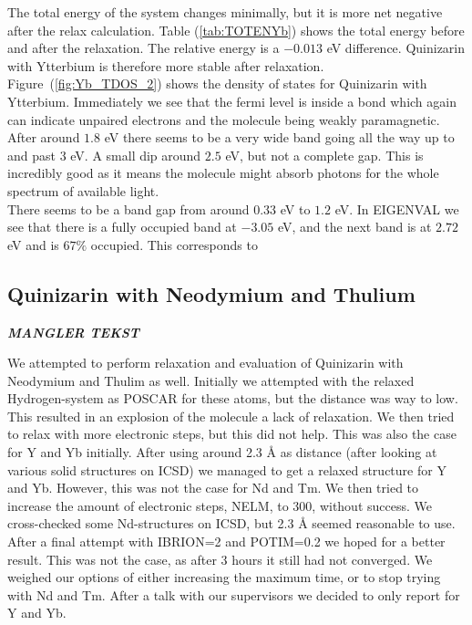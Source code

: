 \documentclass{article}
\begin{document}
    The total energy of the system changes minimally, but it is more net negative after the relax calculation. Table (\ref{tab:TOTENYb}) shows the total energy before and after the relaxation. The relative energy is a $-0.013$ eV difference. Quinizarin with Ytterbium is therefore more stable after relaxation. \\

    Figure~(\ref{fig:Yb_TDOS_2}) shows the density of states for Quinizarin with Ytterbium. Immediately we see that the fermi level is inside a bond which again can indicate unpaired electrons and the molecule being weakly paramagnetic. After around $1.8$ eV there seems to be a very wide band going all the way up to and past $3$ eV. A small dip around $2.5$ eV, but not a complete gap. This is incredibly good as it means the molecule might absorb photons for the whole spectrum of available light. \\

    There seems to be a band gap from around $0.33$ eV to $1.2$ eV. In EIGENVAL we see that there is a fully occupied band at $-3.05$ eV, and the next band is at $2.72$ eV and is $67\%$ occupied. This corresponds to





  \subsection{Quinizarin with Neodymium and Thulium}

    \textbf{\textit{MANGLER TEKST}}

    We attempted to perform relaxation and evaluation of Quinizarin with Neodymium and Thulim as well. Initially we attempted with the relaxed Hydrogen-system as POSCAR for these atoms, but the distance was way to low. This resulted in an explosion of the molecule a lack of relaxation. We then tried to relax with more electronic steps, but this did not help. This was also the case for Y and Yb initially. After using around 2.3 Å as distance (after looking at various solid structures on ICSD) we managed to get a relaxed structure for Y and Yb. However, this was not the case for Nd and Tm. We then tried to increase the amount of electronic steps, NELM, to 300, without success. We cross-checked some Nd-structures on ICSD, but 2.3 Å seemed reasonable to use. After a final attempt with IBRION=2 and POTIM=0.2 we hoped for a better result. This was not the case, as after 3 hours it still had not converged. We weighed our options of either increasing the maximum time, or to stop trying with Nd and Tm. After a talk with our supervisors we decided to only report for Y and Yb. \\
\end{document}
